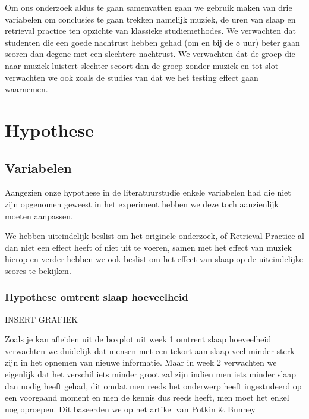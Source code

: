 \documentclass{hogent-article}
\begin{document}
\par
\noindent
Om ons onderzoek aldus te gaan samenvatten gaan we gebruik maken van drie variabelen om conclusies te gaan trekken namelijk muziek, de uren van slaap en retrieval practice ten opzichte van klassieke studiemethodes. We verwachten dat studenten die een goede nachtrust hebben gehad (om en bij de 8 uur) beter gaan scoren dan degene met een slechtere nachtrust. We verwachten dat de groep die naar muziek luistert slechter scoort dan de groep zonder muziek en tot slot verwachten we ook zoals de studies van \textcite{Roediger2006} dat we het testing effect gaan waarnemen.





\section{Hypothese}

\subsection{Variabelen}

Aangezien onze hypothese in de literatuurstudie enkele variabelen had die niet zijn opgenomen geweest in het experiment hebben we deze toch aanzienlijk moeten aanpassen.

We hebben uiteindelijk beslist om het originele onderzoek, of Retrieval Practice al dan niet een effect heeft of niet uit te voeren, samen met het effect van muziek hierop en verder hebben we ook beslist om het effect van slaap op de uiteindelijke scores te bekijken.

\subsubsection{Hypothese omtrent slaap hoeveelheid}

INSERT GRAFIEK

Zoals je kan afleiden uit de boxplot uit week 1 omtrent slaap hoeveelheid verwachten we duidelijk dat mensen met een tekort aan slaap veel minder sterk zijn in het opnemen van nieuwe informatie. Maar in week 2 verwachten we eigenlijk dat het verschil iets minder groot zal zijn indien men iets minder slaap dan nodig heeft gehad, dit omdat men reeds het onderwerp heeft ingestudeerd op een voorgaand moment en men de kennis dus reeds heeft, men moet het enkel nog oproepen. Dit baseerden we op het artikel van Potkin \& Bunney
\end{document}
